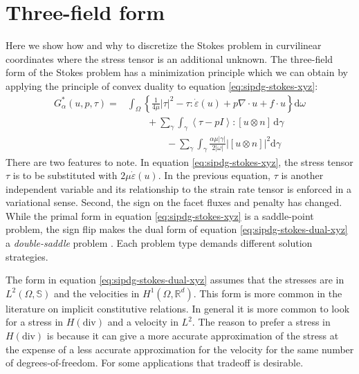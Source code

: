 \documentclass[gmd, manuscript]{copernicus}
\begin{document}
\appendix
\section{Three-field form}

Here we show how and why to discretize the Stokes problem in curvilinear coordinates where the stress tensor is an additional unknown.
The three-field form of the Stokes problem has a minimization principle which we can obtain by applying the principle of convex duality to equation \eqref{eq:sipdg-stokes-xyz}:
\begin{subequations}
\label{eq:sipdg-stokes-dual-xyz}
    \begin{align}
        G_\alpha^*(u, p, \tau) = & \int_\Omega\left\{\frac{1}{4\mu}|\tau|^2 - \tau :\dot\varepsilon(u) + p\nabla\cdot u + f\cdot u\right\}\mathrm d\omega \\
        & \qquad + \sum_\gamma\int_\gamma \left\langle\tau - pI \right\rangle: [u\otimes n]\,\mathrm d\gamma \\
        & \qquad\qquad - \sum_\gamma\int_\gamma\frac{\alpha\mu|\gamma|}{2|\omega|}|[u\otimes n]|^2\mathrm d\gamma
    \end{align}
\end{subequations}
There are two features to note.
In equation \eqref{eq:sipdg-stokes-xyz}, the stress tensor $\tau$ is to be substituted with $2\mu\dot\varepsilon(u)$.
In the previous equation, $\tau$ is another independent variable and its relationship to the strain rate tensor is enforced in a variational sense.
Second, the sign on the facet fluxes and penalty has changed.
While the primal form in equation \eqref{eq:sipdg-stokes-xyz} is a saddle-point problem, the sign flip makes the dual form of equation \eqref{eq:sipdg-stokes-dual-xyz} a \emph{double-saddle} problem \citep{boffi2013mixed}.
Each problem type demands different solution strategies.

The form in equation \eqref{eq:sipdg-stokes-dual-xyz} assumes that the stresses are in $L^2(\Omega, \mathbb S)$ and the velocities in $H^1(\Omega, \mathbb{R}^d)$.
This form is more common in the literature on implicit constitutive relations.
In general it is more common to look for a stress in $H(\text{div})$ and a velocity in $L^2$.
The reason to prefer a stress in $H(\text{div})$ is because it can give a more accurate approximation of the stress at the expense of a less accurate approximation for the velocity for the same number of degrees-of-freedom.
For some applications that tradeoff is desirable.
\end{document}
